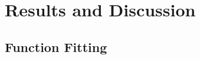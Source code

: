 \documentclass[journal=jacsat,manuscript=article]{achemso}
\begin{document}






\section{Results and Discussion}
\label{section:results_and_discussion}






 



\subsection{Function Fitting}
\end{document}
